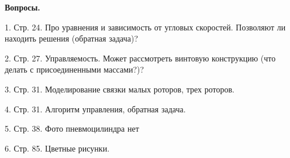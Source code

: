 \textbf{Вопросы.}

1. Стр. 24. Про уравнения и зависимость от угловых скоростей. Позволяют ли находить решения (обратная задача)?

2. Стр. 27. Управляемость. Может рассмотреть винтовую конструкцию (что делать с присоединенными массами?)?

3. Стр. 31. Моделирование связки малых роторов, трех роторов.

4. Стр. 31. Алгоритм управления, обратная задача.

5. Стр. 38. Фото пневмоцилиндра нет

6. Стр. 85. Цветные рисунки.

\clearpage

\tableofcontents*
{}
\endTOCtrue
{}